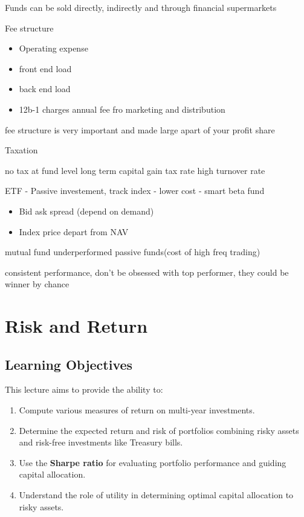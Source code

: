 \documentclass[
]{book}
\providecommand{\tightlist}{%
  \setlength{\itemsep}{0pt}\setlength{\parskip}{0pt}}
\begin{document}
Funds can be sold directly, indirectly and through financial supermarkets

Fee structure

\begin{itemize}
\tightlist
\item
  Operating expense
\item
  front end load
\item
  back end load
\item
  12b-1 charges annual fee fro marketing and distribution
\end{itemize}

fee structure is very important and made large apart of your profit share

Taxation

no tax at fund level
long term capital gain tax rate
high turnover rate

ETF
- Passive investement, track index
- lower cost
- smart beta fund

\begin{itemize}
\tightlist
\item
  Bid ask spread (depend on demand)
\item
  Index price depart from NAV
\end{itemize}

mutual fund underperformed passive funds(cost of high freq trading)

consistent performance, don't be obsessed with top performer, they could be winner by chance

\hypertarget{ch2}{%
\chapter{Risk and Return}\label{ch2}}

\hypertarget{learning-objectives}{%
\section{Learning Objectives}\label{learning-objectives}}

This lecture aims to provide the ability to:

\begin{enumerate}
\def\labelenumi{\arabic{enumi}.}
\tightlist
\item
  Compute various measures of return on multi-year investments.
\item
  Determine the expected return and risk of portfolios combining risky assets and risk-free investments like Treasury bills.
\item
  Use the \textbf{Sharpe ratio} for evaluating portfolio performance and guiding capital allocation.
\item
  Understand the role of utility in determining optimal capital allocation to risky assets.
\end{enumerate}
\end{document}
